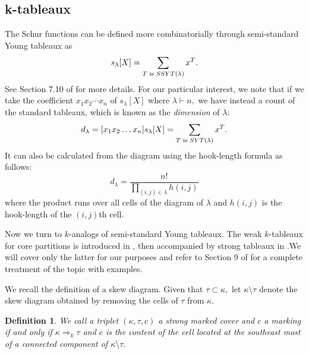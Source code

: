 \documentclass[11pt]{amsart}
\newtheorem{definition}[theorem]{Definition}
\newcommand{\tn}[1]{\textnormal{#1}}
\begin{document}
\subsection{k-tableaux}

The Schur functions can be defined more combinatorially through semi-standard Young tableaux as 
 \begin{equation}\label{ssyt}
     s_{\lambda}[X]=\sum_{T \tn{ is }SSYT(\lambda)} x^T.
 \end{equation}
See Section 7.10 of \cite{S99} for more details. For our particular interest, we note that if we take the coefficient $x_1 x_2 \cdots x_n$ of $s_{\lambda}[X]$ where $\lambda \vdash n,$ we have instead a count of the standard tableaux, which is known as the \textit{dimension} of $\lambda$: 
 \begin{equation}\label{syt}
    d_{\lambda} = [x_1 x_2 \ldots x_n]s_{\lambda}[X]=\sum_{T \tn{ is }SYT(\lambda)} x^T.
 \end{equation}
It can also be calculated from the diagram using the hook-length formula as follows:
\[d_{\lambda}=\frac{n!}{\prod_{(i,j) \in \lambda}h(i,j)}\]
where the product runs over all cells of the diagram of $\lambda$ and $h(i,j)$ is the hook-length of the $(i,j)$th cell.

 Now we turn to $k$-analogs of semi-standard Young tableaux. The weak \tn{$k$-tableaux}  for core partitions is introduced in \cite{LM05}, then accompanied by strong tableaux in \cite{L10}.We will cover only the latter for our purposes and refer to Section 9 of \cite{L10} for a complete treatment of the topic with examples.


We recall the definition of a skew diagram. Given that $\tau \subset \kappa,$ let $\kappa \setminus \tau$ denote the skew diagram obtained by removing the cells of $\tau$ from $\kappa.$ 


\begin{definition}
We call a triplet $(\kappa, \tau, c)$ a strong marked cover and $c$ a marking if and only if $\kappa \Rightarrow_k \tau$ and $c$ is the content of the cell located at the southeast most of a connected component of $\kappa \setminus \tau.$ 
\end{definition}
\end{document}
